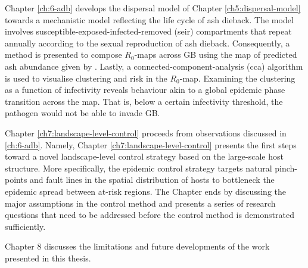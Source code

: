 Chapter \ref{ch:6-adb} develops the dispersal model of Chapter \ref{ch5:dispersal-model} towards a mechanistic model reflecting the life cycle of ash dieback. The model involves susceptible-exposed-infected-removed (\acrshort{seir}) compartments that repeat annually according to the sexual reproduction of ash dieback. Consequently, a method is presented to compose $R_0$-maps
across GB using the map of predicted ash abundance given by \cite{hill.data}. Lastly, a connected-component-analysis
(\acrshort{cca}) algorithm is used to visualise  clustering and risk in the $R_0$-map. Examining the clustering as a function
of infectivity reveals behaviour akin to a global epidemic phase transition across the map. That is, below a certain infectivity threshold, 
the pathogen would not be able to invade GB.

Chapter \ref{ch7:landscape-level-control} proceeds from observations discussed in \ref{ch:6-adb}. 
Namely, Chapter \ref{ch7:landscape-level-control} presents the first steps toward a novel landscape-level
control strategy based on the large-scale host structure. More specifically, the epidemic control strategy targets
natural pinch-points and fault lines in the spatial distribution of hosts to bottleneck the epidemic
spread between at-risk regions. The Chapter ends by discussing the major assumptions in the control method and presents
a series of research questions that need to be addressed before the control method is demonstrated sufficiently.

Chapter 8 discusses the limitations and future developments of the work presented in this thesis.